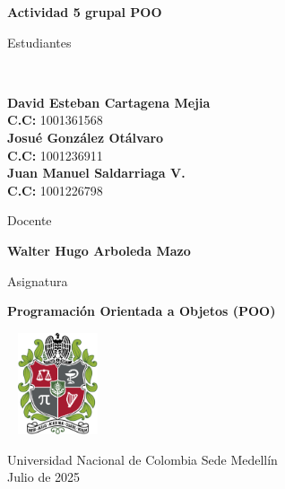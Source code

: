 \begin{titlepage}
	\Large{
	\begin{center}
		\vspace*{1cm}
 
		\textbf{Actividad 5 grupal POO}
 
			 
		\vspace{1.5cm}
		
		Estudiantes
		
		\vspace{0.5cm}
		 \

 
		\textbf{David Esteban Cartagena Mejia} \\
		  \textbf{C.C:} 1001361568 \\	

		\textbf{Josué González Otálvaro} \\
		  \textbf{C.C:} 1001236911 \\	  		 

		 \textbf{Juan Manuel Saldarriaga V.} \\
		  \textbf{C.C:} 1001226798 \\
		  
	 
 
	   \vspace{1cm}
		
		Docente 
		
		\vspace{0.5cm}
 
		\textbf{Walter Hugo Arboleda Mazo}
		\vspace{0.4cm}
		\vspace{1cm}
		
		Asignatura
		
		\vspace{0.5cm}
 
		\textbf{Programación Orientada a Objetos (POO)}
 
		\vfill
 
		\includegraphics[width=3cm,height=3cm]{logo.png}\\[0.2cm]
	  
		\vspace{0.2cm}
	  
				 
		Universidad Nacional de Colombia Sede Medellín\\
		Julio de 2025
		
	\end{center}
	}
 \end{titlepage}